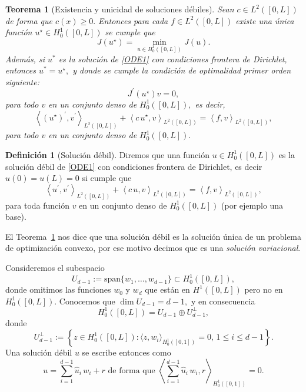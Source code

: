 \documentclass[10pt,handout]{beamer}
\theoremstyle{plain} %
\newtheorem{thm}{Teorema}
\theoremstyle{plain} %
\theoremstyle{plain} %
\theoremstyle{plain} %
\theoremstyle{definition}
\newtheorem{defn}{Definici\'on}
\theoremstyle{example}
\theoremstyle{example}
\theoremstyle{remark}
\theoremstyle{remark}
\begin{document}
\begin{frame}
\begin{thm}[Existencia y unicidad de soluciones débiles]\label{thm1}
Sean $c \in L^2([0,L])$ de forma que $c(x) \ge 0.$ Entonces para cada $f \in L^2([0,L])$ 
existe una única función $u^{\star} \in H_0^1([0,L])$ se cumple que
$$
J(u^{\star}) = \min_{u \in H_0^1([0,L])}J(u).
$$
Además, si $u^*$ es la solución de \eqref{ODE1} con condiciones frontera de Dirichlet, 
entonces $u^*=u^{\star},$ y donde se cumple la condición de optimalidad primer orden
siguiente:
\begin{equation}
J^{\prime}(u^{\star}) v = 0, \label{optim1}
\end{equation}
para todo $v$ en un conjunto denso de $H_0^1([0,L]),$ es decir,
\begin{equation}
\left\langle  (u^{\star})^{\prime} , v^{\prime} \right\rangle_{L^2([0,L])}  + \left\langle  c\,u^{\star}, v \right\rangle_{L^2([0,L])} =  \left\langle f, v \right\rangle_{L^2([0,L])},
\end{equation}
para todo $v$ en un conjunto denso de $H_0^1([0,L]).$
\end{thm}
\end{frame}

\begin{frame}
\begin{defn}[Solución débil]
Diremos que una función $u \in H_0^1([0,L])$ es la solución débil de \eqref{ODE1} con condiciones frontera de Dirichlet, es decir $u(0)=u(L)=0$ si cumple que
\begin{equation}
\left\langle  u^{\prime} , v^{\prime} \right\rangle_{L^2([0,L])}  + \left\langle  c\,u, v \right\rangle_{L^2([0,L])} =  \left\langle f, v \right\rangle_{L^2([0,L])},
\end{equation}
para toda función $v$ en un conjunto denso de $H_{0}^1([0,L])$ (por ejemplo una base).
\end{defn}
El Teorema~\ref{thm1} nos dice que una solución débil es la solución única de un problema de optimización convexo, por ese motivo decimos que es una \emph{solución variacional}.
\end{frame}

\begin{frame}
Consideremos el subespacio 
$$
U_{d-1} := \mathrm{span}\{w_1,\ldots,w_{d-1}\} \subset H_0^1([0,L]),
$$
donde omitimos las funciones $w_0$ y $w_d$ que están en $H^1([0,L])$ pero no en $H_0^1([0,L]).$ Conocemos
que $\dim U_{d-1}=d-1,$ y en consecuencia
$$
 H_0^1([0,L]) = U_{d-1} \oplus U_{d-1}^{\bot},
$$
donde
$$
U_{d-1}^{\bot} := \left\{
z \in H_0^1([0,L]): \langle z,w_i \rangle_{H_0^1([0,1])} = 0, \, 1 \le i \le d-1
\right\}.
$$
Una solución débil $u$ se escribe entonces como
$$
u = \sum_{i=1}^{d-1} \widehat{u}_i \, w_i + r  \text{ de forma que } \left\langle 
 \sum_{i=1}^{d-1} \widehat{u}_i \, w_i, r
\right\rangle_{H_0^1([0,1])}  = 0.
$$
\end{frame}
\end{document}
